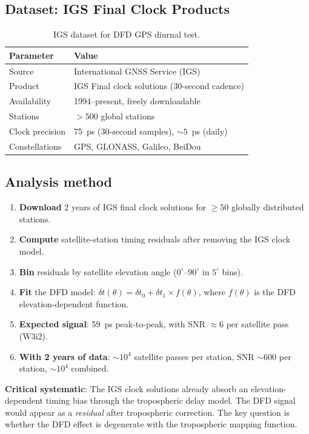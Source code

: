 \documentclass[11pt]{article}
\begin{document}
\subsection{Dataset: IGS Final Clock Products}

\begin{table}[H]
\centering
\caption{IGS dataset for DFD GPS diurnal test.}
\begin{tabular}{ll}
\toprule
\textbf{Parameter} & \textbf{Value} \\
\midrule
Source & International GNSS Service (IGS) \\
Product & IGS Final clock solutions (30-second cadence) \\
Availability & 1994--present, freely downloadable \\
Stations & $> 500$ global stations \\
Clock precision & 75~ps (30-second samples), $\sim 5$~ps (daily) \\
Constellations & GPS, GLONASS, Galileo, BeiDou \\
\bottomrule
\end{tabular}
\end{table}

\subsection{Analysis method}

\begin{enumerate}
\item \textbf{Download} 2 years of IGS final clock solutions for
  $\geq 50$ globally distributed stations.
\item \textbf{Compute} satellite-station timing residuals after removing
  the IGS clock model.
\item \textbf{Bin} residuals by satellite elevation angle ($0^\circ$--$90^\circ$
  in $5^\circ$ bins).
\item \textbf{Fit} the DFD model: $\delta t(\theta) = \delta t_0
  + \delta t_1\times f(\theta)$, where $f(\theta)$ is the DFD
  elevation-dependent function.
\item \textbf{Expected signal}: 59~ps peak-to-peak, with SNR $\approx 6$
  per satellite pass (W3i2).
\item \textbf{With 2 years of data}: $\sim 10^4$ satellite passes per
  station, SNR $\sim 600$ per station, $\sim 10^4$ combined.
\end{enumerate}

\textbf{Critical systematic}: The IGS clock solutions already absorb
an elevation-dependent timing bias through the tropospheric delay model.
The DFD signal would appear as a \emph{residual} after tropospheric
correction. The key question is whether the DFD effect is degenerate
with the tropospheric mapping function.
\end{document}

